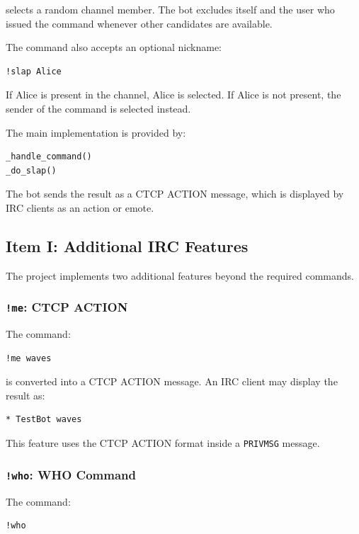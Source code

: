 \documentclass[a4paper,12pt]{article}
\begin{document}
selects a random channel member. The bot excludes itself and the user who issued the command whenever other candidates are available.

The command also accepts an optional nickname:

\begin{verbatim}
!slap Alice
\end{verbatim}

If Alice is present in the channel, Alice is selected. If Alice is not present, the sender of the command is selected instead.

The main implementation is provided by:

\begin{lstlisting}[language=Python]
_handle_command()
_do_slap()
\end{lstlisting}

The bot sends the result as a CTCP ACTION message, which is displayed by IRC clients as an action or emote.

\subsection{Item I: Additional IRC Features}

The project implements two additional features beyond the required commands.

\subsubsection{\texttt{!me}: CTCP ACTION}

The command:

\begin{verbatim}
!me waves
\end{verbatim}

is converted into a CTCP ACTION message. An IRC client may display the result as:

\begin{verbatim}
* TestBot waves
\end{verbatim}

This feature uses the CTCP ACTION format inside a \texttt{PRIVMSG} message.

\subsubsection{\texttt{!who}: WHO Command}

The command:

\begin{verbatim}
!who
\end{verbatim}
\end{document}
